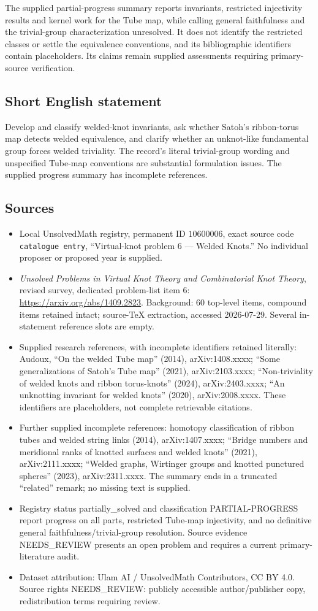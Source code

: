 \documentclass[11pt]{article}
\begin{document}
The supplied partial-progress summary reports invariants, restricted injectivity results and kernel work for the Tube map, while calling general faithfulness and the trivial-group characterization unresolved. It does not identify the restricted classes or settle the equivalence conventions, and its bibliographic identifiers contain placeholders. Its claims remain supplied assessments requiring primary-source verification.
\subsection{Short English statement}
Develop and classify welded-knot invariants, ask whether Satoh's ribbon-torus map detects welded equivalence, and clarify whether an unknot-like fundamental group forces welded triviality. The record's literal trivial-group wording and unspecified Tube-map conventions are substantial formulation issues. The supplied progress summary has incomplete references.
\subsection{Sources}
\begin{itemize}
\item Local UnsolvedMath registry, permanent ID \(10600006\), exact source code \texttt{catalogue entry}, ``Virtual-knot problem 6 --- Welded Knots.'' No individual proposer or proposed year is supplied.
\item \emph{Unsolved Problems in Virtual Knot Theory and Combinatorial Knot Theory}, revised survey, dedicated problem-list item 6: \url{https://arxiv.org/abs/1409.2823}. Background: 60 top-level items, compound items retained intact; source-TeX extraction, accessed 2026-07-29. Several in-statement reference slots are empty.
\item Supplied research references, with incomplete identifiers retained literally: Audoux, ``On the welded Tube map'' (2014), arXiv:1408.xxxx; ``Some generalizations of Satoh's Tube map'' (2021), arXiv:2103.xxxx; ``Non-triviality of welded knots and ribbon torus-knots'' (2024), arXiv:2403.xxxx; ``An unknotting invariant for welded knots'' (2020), arXiv:2008.xxxx. These identifiers are placeholders, not complete retrievable citations.
\item Further supplied incomplete references: homotopy classification of ribbon tubes and welded string links (2014), arXiv:1407.xxxx; ``Bridge numbers and meridional ranks of knotted surfaces and welded knots'' (2021), arXiv:2111.xxxx; ``Welded graphs, Wirtinger groups and knotted punctured spheres'' (2023), arXiv:2311.xxxx. The summary ends in a truncated ``related'' remark; no missing text is supplied.
\item Registry status partially\_solved and classification PARTIAL-PROGRESS report progress on all parts, restricted Tube-map injectivity, and no definitive general faithfulness/trivial-group resolution. Source evidence NEEDS\_REVIEW presents an open problem and requires a current primary-literature audit.
\item Dataset attribution: Ulam AI / UnsolvedMath Contributors, CC BY 4.0. Source rights NEEDS\_REVIEW: publicly accessible author/publisher copy, redistribution terms requiring review.
\end{itemize}
\end{document}

